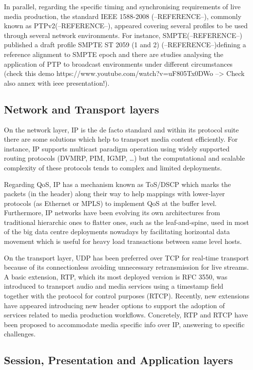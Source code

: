 In parallel, regarding the specific timing and synchronising requirements of live media production, the standard IEEE 1588-2008 (--REFERENCE--), commonly known as PTPv2(--REFERENCE--), appeared covering several profiles to be used through several network environments. For instance, SMPTE(--REFERENCE--) published a draft profile SMPTE ST 2059 (1 and 2) (--REFERENCE--)defining a reference alignment to SMPTE epoch and there are studies analysing the application of PTP to broadcast environments under different circumstances (check this demo https://www.youtube.com/watch?v=uF805Tx0DWo --> Check also annex with ieee presentation!).

\subsection{Network and Transport layers}

On the network layer, IP is the de facto standard and within its protocol suite there are some solutions which help to transport media content efficiently. For instance, IP supports multicast paradigm operation using widely supported routing protocols (DVMRP, PIM, IGMP, \ldots) but the
computational and scalable complexity of these protocols tends to complex and limited deployments.

Regarding QoS, IP has a mechanism known as ToS/DSCP which marks the packets (in the header) along their way to help mappings with lower-layer protocols (as Ethernet or MPLS) to implement QoS at the buffer level. Furthermore, IP networks have been evolving its own architectures from
traditional hierarchic ones to flatter ones, such as the leaf-and-spine, used in most of the big data centre deployments nowadays by facilitating horizontal data movement which is useful for heavy load transactions between same level hosts.

On the transport layer, UDP has been preferred over TCP for real-time transport because of its connectionless avoiding unnecessary retransmission for live streams. A basic extension, RTP, which its most
deployed version is RFC 3550, was introduced to transport audio and media services using a timestamp field together with the protocol for control purposes (RTCP). Recently, new extensions have appeared introducing new header options to support the adoption of services related to media production workflows. Concretely, RTP and RTCP have been proposed to accommodate media specific info over IP, answering to specific challenges.

\subsection{Session, Presentation and Application layers}

